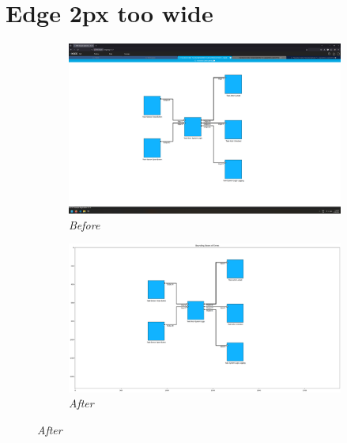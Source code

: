 \documentclass{article}
\begin{document}
\section{Edge 2px too wide}
\begin{figure}[H]
    \centering
    \begin{subfigure}[t]{0.9\textwidth}
        \centering
        \includegraphics[width=\textwidth]{testcases/edge_2px_too_wide/144434-620311_input_image.png}
        \caption*{\textit{Before}}
    \end{subfigure}
    \newline    
    \begin{subfigure}[t]{0.9\textwidth}
        \centering
        \includegraphics[width=\textwidth]{testcases/edge_2px_too_wide/144456-554148_element_bbox_errors_labeled_colored.png}
        \caption*{\textit{After}}
    \end{subfigure}
    \label{fig:edge_too_wide_2}
\end{figure}
\newpage
\end{document}
